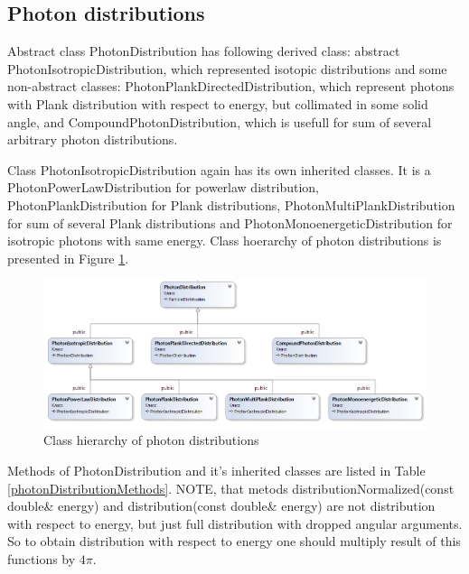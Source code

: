\subsection{Photon distributions}

Abstract class PhotonDistribution has following derived class: abstract PhotonIsotropicDistribution, which represented isotopic distributions and some non-abstract classes: PhotonPlankDirectedDistribution, which represent photons with Plank distribution with respect to energy, but collimated in some solid angle, and CompoundPhotonDistribution, which is usefull for sum of several arbitrary photon distributions.

Class PhotonIsotropicDistribution again has its own inherited classes. It is a PhotonPowerLawDistribution for powerlaw distribution, PhotonPlankDistribution for Plank distributions, PhotonMultiPlankDistribution for sum of several Plank distributions and PhotonMonoenergeticDistribution for isotropic photons with same energy. Class hoerarchy of photon distributions is presented in Figure \ref{photonDistribution}.

\begin{figure}
	\centering
	\includegraphics[width=10.5 cm]{./fig/photonDistribution2.png} 
	\caption{Class hierarchy of photon distributions}
	\label{photonDistribution}
\end{figure}

Methods of PhotonDistribution and it's inherited classes are listed in Table \ref{photonDistributionMethods}. NOTE, that metods distributionNormalized(const double\& energy) and distribution(const double\& energy) are not distribution with respect to energy, but just full distribution with dropped angular arguments. So to obtain distribution with respect to energy one should multiply result of this functions by $4\pi$.


